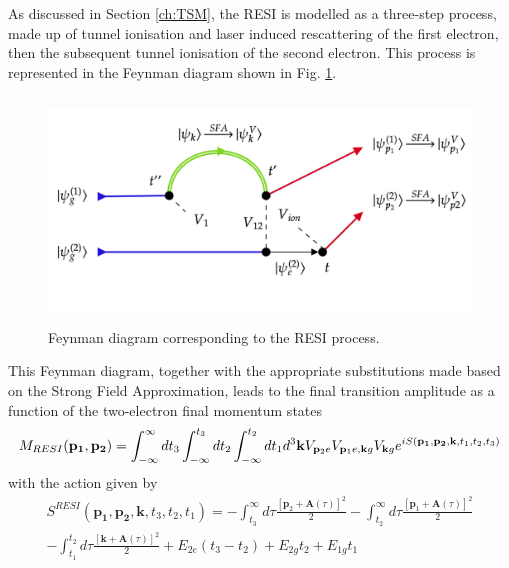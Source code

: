 \documentclass[11pt]{article}
\numberwithin{equation}{section}
\begin{document}
As discussed in Section \ref{ch:TSM}, the RESI is modelled as a three-step process, made up of tunnel ionisation and laser induced rescattering of the first electron, then the subsequent tunnel ionisation of the second electron. This process is represented in the Feynman diagram shown in Fig. \ref{fig:NSDI_feyn}. 
\begin{figure}[!htb]
    \centering
    \includegraphics[width = 14cm,height=6cm]{Figures/diagram-20200406.png}
    \caption{Feynman diagram corresponding to the RESI process.}
    \label{fig:NSDI_feyn}
\end{figure}
\newline
This Feynman diagram, together with the appropriate substitutions made based on the Strong Field Approximation, leads to the final transition amplitude as a function of the two-electron final momentum states
\begin{equation} \label{}
   M_{RESI}(\mathbf{p_1},\mathbf{p_2}) = \int_{-\infty}^{\infty}dt_3\int_{-\infty}^{t_3}dt_2\int_{-\infty}^{t_2}dt_1\\ d^3\mathbf{k} V_{\mathbf{p}_2e}V_{\mathbf{p}_1e,\mathbf{k}g}V_{\mathbf{k}g}
   e^{iS(\mathbf{p_1},\mathbf{p_2},\mathbf{k},t_1,t_2,t_3)}
\end{equation}
with the action given by 
\begin{multline} \label{eq:NSDIaction}
    S^{RESI}(\mathbf{p_1},\mathbf{p_2},\mathbf{k},t_3,t_2,t_1) = -\int_{t_3}^{\infty} d\tau \frac{[\mathbf{p}_2 + \mathbf{A}(\tau)]^2}{2} - \int_{t_2}^{\infty} d\tau \frac{[\mathbf{p}_1 + \mathbf{A}(\tau)]^2}{2} \\
    - \int_{t_1}^{t_2} d\tau \frac{[\mathbf{k} + \mathbf{A}(\tau)]^2}{2} + E_{2e}(t_3-t_2) + E_{2g}t_2 + E_{1g}t_1
\end{multline}
\end{document}
